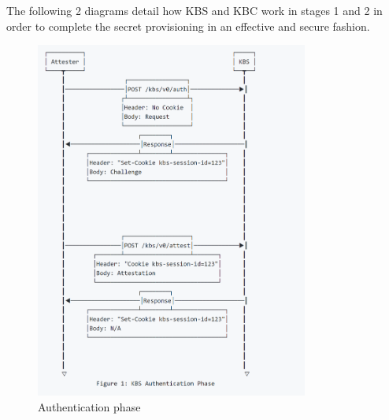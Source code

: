 The following 2 diagrams detail how KBS and KBC work in stages 1 and 2 in order to complete the secret provisioning in an effective and secure fashion.
\begin{figure}[H]
    \centering
    \includegraphics[width=0.8\textwidth]{images/attestation.PNG}
    \caption[Authentication phase]{Authentication phase}
    \label{fig:Authentication}
\end{figure}

